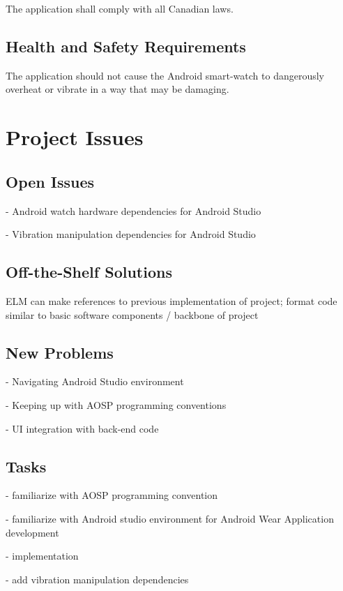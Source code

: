 \documentclass[12pt, titlepage]{article}
\begin{document}
The application shall comply with all Canadian laws.

\subsection{Health and Safety Requirements}

The application should not cause the Android smart-watch to dangerously overheat or vibrate in a way that may be damaging.

\section{Project Issues}

\subsection{Open Issues}

- Android watch hardware dependencies for Android Studio

\noindent - Vibration manipulation dependencies for Android Studio

\subsection{Off-the-Shelf Solutions}

ELM can make references to previous implementation of project; format code similar to basic software components / backbone of project


\subsection{New Problems}

- Navigating Android Studio environment

\noindent - Keeping up with AOSP programming conventions

\noindent - UI integration with back-end code

\subsection{Tasks}

- familiarize with AOSP programming convention

\noindent - familiarize with Android studio environment for Android Wear Application development

\noindent - implementation

- add vibration manipulation dependencies
\end{document}
